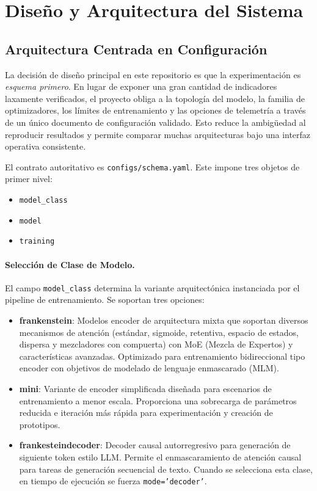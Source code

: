 \section{Diseño y Arquitectura del Sistema}
\label{sec:system-design}

\subsection{Arquitectura Centrada en Configuración}
\label{sec:config-centric-architecture}

La decisión de diseño principal en este repositorio es que la experimentación es \emph{esquema primero}. En lugar de exponer una gran cantidad de indicadores laxamente verificados, el proyecto obliga a la topología del modelo, la familia de optimizadores, los límites de entrenamiento y las opciones de telemetría a través de un único documento de configuración validado. Esto reduce la ambigüedad al reproducir resultados y permite comparar muchas arquitecturas bajo una interfaz operativa consistente.

El contrato autoritativo es \texttt{configs/schema.yaml}. Este impone tres objetos de primer nivel:
\begin{itemize}[leftmargin=*]
    \item \texttt{model\_class}
    \item \texttt{model}
    \item \texttt{training}
\end{itemize}

\paragraph{Selección de Clase de Modelo.}
El campo \texttt{model\_class} determina la variante arquitectónica instanciada por el pipeline de entrenamiento. Se soportan tres opciones:
\begin{itemize}[leftmargin=*]
    \item \textbf{frankenstein}: Modelos encoder de arquitectura mixta que soportan diversos mecanismos de atención (estándar, sigmoide, retentiva, espacio de estados, dispersa y mezcladores con compuerta) con MoE (Mezcla de Expertos) y características avanzadas. Optimizado para entrenamiento bidireccional tipo encoder con objetivos de modelado de lenguaje enmascarado (MLM).
    \item \textbf{mini}: Variante de encoder simplificada diseñada para escenarios de entrenamiento a menor escala. Proporciona una sobrecarga de parámetros reducida e iteración más rápida para experimentación y creación de prototipos.
    \item \textbf{frankesteindecoder}: Decoder causal autorregresivo para generación de siguiente token estilo LLM. Permite el enmascaramiento de atención causal para tareas de generación secuencial de texto. Cuando se selecciona esta clase, en tiempo de ejecución se fuerza \texttt{mode='decoder'}.
\end{itemize}

